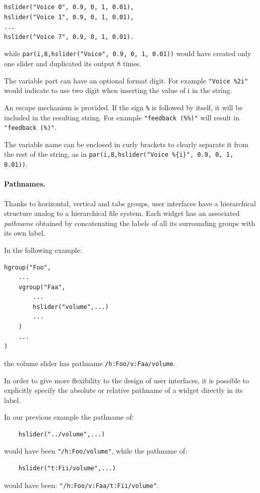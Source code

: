 \begin{lstlisting}
hslider("Voice 0", 0.9, 0, 1, 0.01),
hslider("Voice 1", 0.9, 0, 1, 0.01),
...
hslider("Voice 7", 0.9, 0, 1, 0.01).
\end{lstlisting}

while \lstinline'par(i,8,hslider("Voice", 0.9, 0, 1, 0.01))' would have created only one slider and duplicated its output 8 times.

The variable part can have an optional format digit. 
For example \lstinline'"Voice %2i"' would indicate to use two digit when inserting the value of i in the string.

An escape mechanism is provided.
If the sign \lstinline'%' is followed by itself, it will be included in the resulting string.
For example \lstinline'"feedback (%%)"' will result in \lstinline'"feedback (%)"'.

The variable name can be enclosed in curly brackets to clearly separate it from the rest of the string, as in \lstinline'par(i,8,hslider("Voice %{i}", 0.9, 0, 1, 0.01))'.



\paragraph{Pathnames.}
Thanks to horizontal, vertical and tabs groups, user interfaces have a hierarchical structure analog to a hierarchical file system. Each widget has an associated \textit{pathname} obtained by concatenating the labels of all its surrounding groups with its own label.

In the following example:
\begin{lstlisting}
hgroup("Foo",
	...
	vgroup("Faa", 
		...
		hslider("volume",...)
		...
	)
	...
)
\end{lstlisting}
the volume slider has pathname \lstinline'/h:Foo/v:Faa/volume'.

In order to give more flexibility to the design of user interfaces, it is possible to explicitly specify the absolute or relative pathname of a widget directly in its label. 

In our previous example the pathname of:
\begin{lstlisting}
	hslider("../volume",...)
\end{lstlisting}
would have been \lstinline'"/h:Foo/volume"', while the pathname of:
\begin{lstlisting}
	hslider("t:Fii/volume",...)
\end{lstlisting}
would have been: 
\lstinline'"/h:Foo/v:Faa/t:Fii/volume"'.

